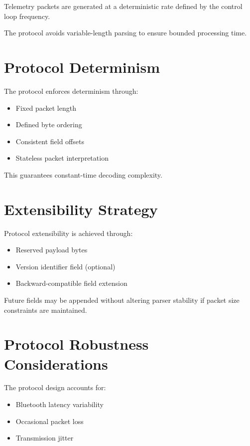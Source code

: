 Telemetry packets are generated at a deterministic rate defined by the control loop frequency.

The protocol avoids variable-length parsing to ensure bounded processing time.


\section{Protocol Determinism}

The protocol enforces determinism through:

\begin{itemize}
	\item Fixed packet length
	\item Defined byte ordering
	\item Consistent field offsets
	\item Stateless packet interpretation
\end{itemize}

This guarantees constant-time decoding complexity.


\section{Extensibility Strategy}

Protocol extensibility is achieved through:

\begin{itemize}
	\item Reserved payload bytes
	\item Version identifier field (optional)
	\item Backward-compatible field extension
\end{itemize}

Future fields may be appended without altering parser stability if packet size constraints are maintained.


\section{Protocol Robustness Considerations}

The protocol design accounts for:

\begin{itemize}
	\item Bluetooth latency variability
	\item Occasional packet loss
	\item Transmission jitter
\end{itemize}

